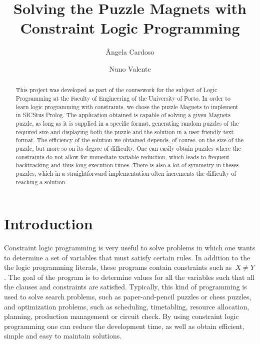 \documentclass{llncs}
\begin{document}
\title{Solving the Puzzle Magnets with Constraint Logic Programming}
\author{\^Angela Cardoso \and Nuno Valente}
\maketitle


\begin{abstract}
	
	This project was developed as part of the coursework for the subject of Logic Programming at the Faculty of Engineering of the University of Porto. In order to learn logic programming with constraints, we chose the puzzle Magnets to implement in SICStus Prolog. The application obtained is capable of solving a given Magnets puzzle, as long as it is supplied in a specific format, generating random puzzles of the required size and displaying both the puzzle and the solution in a user friendly text format. The efficiency of the solution we obtained depends, of course, on the size of the puzzle, but more so on its degree of difficulty. One can easily obtain puzzles where the constraints do not allow for immediate variable reduction, which leads to frequent backtracking and thus long execution times. There is also a lot of symmetry in theses puzzles, which in a straightforward implementation often increments the difficulty of reaching a solution. 
	
\end{abstract}


\section{Introduction}

Constraint logic programming is very useful to solve problems in which one wants to determine a set of variables that must satisfy certain rules. In addition to the the logic programming literals, these programs contain constraints such as~$X \neq Y$. The goal of the program is to determine values for all the variables such that all the clauses and constraints are satisfied. Typically, this kind of programming is used to solve search problems, such as paper-and-pencil puzzles or chess puzzles, and optimization problems, such as scheduling, timetabling, resource allocation, planning, production management or circuit check. By using constraint logic programming one can reduce the development time, as well as obtain efficient, simple and easy to maintain solutions.
\end{document}
